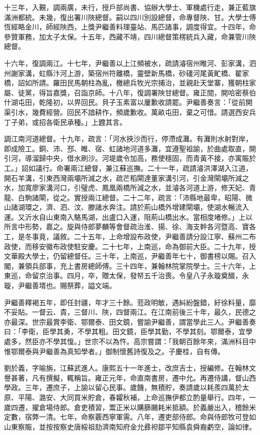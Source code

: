 \begin{pinyinscope}
十三年，入覲，調兩廣，未行，授戶部尚書、協辦大學士、軍機處行走，兼正藍旗滿洲都統。未幾，復出署川陜總督。嗣以四川別設總督，命專督陜、甘。大學士傅恆經略金川，師經陜西，上獎尹繼善料理臺站、馬匹諸事，調度得宜。十四年，命參贊軍務，加太子太保。十五年，西藏不靖，四川總督策楞統兵入藏，命兼管川陜總督。

十六年，復調兩江。十七年，尹繼善以上江頻被水，疏請濬宿州睢河、彭家溝，泗州謝家溝，虹縣汴河上游，築宿州符離橋，靈壁新馬橋，砂礓河尾黃甿橋、翟家橋，詔如所請。羅田民馬朝柱為亂，檄總兵牧光宗捕治，並親赴天堂寨，獲朝柱家屬、徒黨，得旨嘉獎，召詣京師。十八年，復調署陜甘總督。雍正間，開哈密蔡伯什湖屯田，乾隆初，以畀回民。貝子玉素富以屢歉收請罷。尹繼善奏言：「從前開渠引水，幾費經營。回民不諳耕作，頻歲歉收。萬畝屯田，棄之可惜。請選西安兵丁子弟，或招各衛民承種。」上韙其言。

調江南河道總督。十九年，疏言：「河水挾沙而行，停滯成灘。有灘則水射對岸，即成險工。銅、沛、邳、睢、宿、虹諸地河道多灘，宜遵聖祖諭，於曲處取直，開引河，導溜歸中央，借水刷沙。河堤歲令加高，務使穩固，而青黃不接，亦寓賑於工。」詔如議行。命署兩江總督，兼江蘇巡撫。二十一年，疏請濬洪澤湖入江道，開石羊溝，引東西灣兩壩所減之水，疏芒稻閘達董家溝引河，引金灣閘壩所減之水，加寬廖家溝河口，引璧虎、鳳凰兩橋所減之水，並濬各河道上游，修天妃、青龍、白駒諸閘，從之。實授兩江總督。二十二年，疏言：「沛縣地最卑，昭陽、微山諸湖環之，濟、泗、汶、滕諸水奔注。請於荊山橋外增建閘壩，使湖水暢流入運。又沂水自山東南入駱馬湖，出盧口入運，阻荊山橋出水。當相度堵修。」上以所言中形勢，嘉之。旋與侍郎夢麟等會督疏治淮、揚、徐、海支幹各河暨高、寶各工，是冬事竟，議敘。二十五年，上命增設布政使，尹繼善請分設江寧、蘇州二布政使，而移安徽布政使駐安慶。二十七年，上南巡，命為御前大臣。二十九年，授文華殿大學士，仍留總督任。三十年，上南巡，尹繼善年七十，御書榜以賜。召入閣，兼領兵部事，充上書房總師傅。三十四年，兼翰林院掌院學士。三十六年，上東巡，命留京治事。四月，卒，贈太保，發帑五千治喪。令皇八子永璇奠醊，永璇，尹繼善壻也。賜祭葬，謚文端。

尹繼善釋褐五年，即任封疆，年才三十餘。蒞政明敏，遇糾紛盤錯，紆徐料量，靡不妥貼。一督云、貴，三督川、陜，四督兩江。在江南前後三十年，最久，民德之亦最深。世宗最賞李衛、鄂爾泰、田文鏡，嘗諭尹繼善，謂當學此三人。尹繼善奏曰：「李衛，臣學其勇，不學其粗。田文鏡，臣學其勤，不學其刻。鄂爾泰，宜學處多，然臣亦不學其愎。」世宗不以為忤。高宗嘗謂：「我朝百餘年來，滿洲科目中惟鄂爾泰與尹繼善為真知學者。」御制懷舊詩復及之。子慶桂，自有傳。

劉於義，字喻旃，江蘇武進人。康熙五十一年進士，改庶吉士，授編修。在翰林文譽甚著，凡有撰擬，輒稱旨。雍正元年，命直南書房，遷中允。再遷侍講，督山西學政。三年，遷庶子，上諭以留心民事。歲饑，無積貯，奏請歲以耗羨四萬於太原、平陽、潞安、大同買米貯倉，春糶秋補，上命巡撫伊都立酌量舉行。四年，一歲四遷，擢倉場侍郎。倉吏積習，鬻正米以購篩颺耗米抵額。於義嚴出入，稽餘米定數，宿弊一清。七年，命察覈西寧軍需。八年，遷吏部侍郎。命與侍郎牧可登如山東察賑，並按按察史唐綏祖劾濟南知府金允彞袒鄒平知縣袁舜裔虧空，論如律。


\end{pinyinscope}
